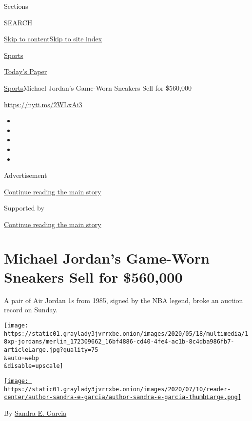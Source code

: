 Sections

SEARCH

\protect\hyperlink{site-content}{Skip to
content}\protect\hyperlink{site-index}{Skip to site index}

\href{https://www.nytimes3xbfgragh.onion/section/sports}{Sports}

\href{https://myaccount.nytimes3xbfgragh.onion/auth/login?response_type=cookie\&client_id=vi}{}

\href{https://www.nytimes3xbfgragh.onion/section/todayspaper}{Today's
Paper}

\href{/section/sports}{Sports}\textbar{}Michael Jordan's Game-Worn
Sneakers Sell for \$560,000

\url{https://nyti.ms/2WLxAi3}

\begin{itemize}
\item
\item
\item
\item
\item
\end{itemize}

Advertisement

\protect\hyperlink{after-top}{Continue reading the main story}

Supported by

\protect\hyperlink{after-sponsor}{Continue reading the main story}

\hypertarget{michael-jordans-game-worn-sneakers-sell-for-560000}{%
\section{Michael Jordan's Game-Worn Sneakers Sell for
\$560,000}\label{michael-jordans-game-worn-sneakers-sell-for-560000}}

A pair of Air Jordan 1s from 1985, signed by the NBA legend, broke an
auction record on Sunday.

\texttt{[image: https://static01.graylady3jvrrxbe.onion/images/2020/05/18/multimedia/18xp-jordans/merlin\_172309662\_16bf4886-cd40-4fe4-ac1b-8c4dba986fb7-articleLarge.jpg?quality=75\\\&auto=webp\\\&disable=upscale]}

\href{https://www.nytimes3xbfgragh.onion/by/sandra-e-garcia}{\texttt{[image: https://static01.graylady3jvrrxbe.onion/images/2020/07/10/reader-center/author-sandra-e-garcia/author-sandra-e-garcia-thumbLarge.png]}}

By \href{https://www.nytimes3xbfgragh.onion/by/sandra-e-garcia}{Sandra
E. Garcia}

